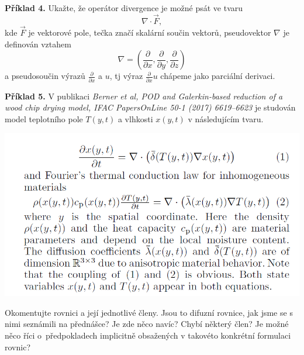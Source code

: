\documentclass{article}
\let\rho\varrho
\let\oldtextbf\textbf
\def\textbf#1{%
  \oldtextbf{\color{red} #1}}
\begin{document}
  
  \newpage

\textbf{Příklad 4.}
  Ukažte, že operátor divergence je možné psát ve tvaru
  \begin{equation*}
    \nabla \cdot \vec F,
  \end{equation*}
  kde $\vec F$ je vektorové pole, tečka značí skalární součin vektorů, pseudovektor $\nabla$ je definován vztahem
  \begin{equation*}
    \nabla =\left(\frac{\partial }{\partial x}, \frac{\partial }{\partial y}, \frac{\partial }{\partial z} \right)
  \end{equation*}
  a pseudosoučin výrazů $\frac{\partial}{\partial x}$ a $u$, tj výraz $\frac{\partial}{\partial x} u$ chápeme
  jako parciální derivaci.


  \newpage

  \let\overbar\overline
  \textbf{Příklad 5.}  V publikaci \textit{Berner et al, POD and Galerkin-based reduction of a wood chip drying model, IFAC PapersOnLine 50-1 (2017) 6619--6623}
  je studován model teplotního pole $T(y,t)$ a vlhkosti $x(y,t)$ v následujícím tvaru.

{\centering
  \includegraphics[width=0.7\linewidth]{berner.png}

  }

  
  Okomentujte rovnici a její jednotlivé členy. Jsou to difuzní rovnice, jak jsme se s nimi seznámili na přednášce? Je zde něco navíc? Chybí některý člen? Je možné něco říci o~předpokladech implicitně obsažených v takovéto konkrétní formulaci rovnic?
\end{document}
